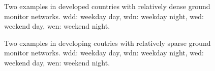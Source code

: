 \documentclass{article}
\begin{document}
\begin{figure}%
    \centering
    \qquad
    \caption{Two examples in developed countries with relatively dense ground monitor networks.  wdd: weekday day, wdn: weekday night, wed: weekend day, wen: weekend night.}%
    \label{fig:hamla}%
\end{figure}

\begin{figure}%
    \centering
    \qquad
    \caption{Two examples in developing coutries with relatively sparse ground monitor networks.  wdd: weekday day, wdn: weekday night, wed: weekend day, wen: weekend night.}%
    \label{fig:adbo}%
\end{figure}
\end{document}
